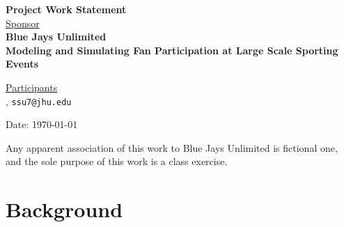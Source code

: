 \documentclass[12pt,letterpaper]{article}
\theoremstyle{definition}
\begin{document}
\def\shiftdowna{0.32in}  %
\def\shiftdownb{0.22in}  %


\begin{center}
\textbf{{\large Project Work Statement}}\\


\vspace \shiftdowna
\underline {Sponsor}\\ 
\vspace{5pt}
\textbf{{\large Blue Jays Unlimited}}\\


\vspace \shiftdowna
\textbf{{\large Modeling and Simulating Fan Participation at Large Scale Sporting Events}}


\vspace{0.35in}
\vspace \shiftdownb
\underline {Participants} \\
\vspace{5pt}
, \texttt{ssu7@jhu.edu}


\vspace \shiftdowna
Date: \today

\end{center}

\vfill  
\footnoterule
\noindent \small{Any apparent association of this work to Blue Jays Unlimited is
fictional one, and the sole purpose of this work is a class exercise.}

\newpage

\section{Background}
\end{document}

